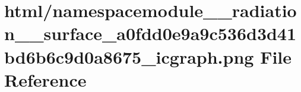 \hypertarget{namespacemodule____radiation____surface__a0fdd0e9a9c536d3d41bd6b6c9d0a8675__icgraph_8png}{}\section{html/namespacemodule\+\_\+\+\_\+radiation\+\_\+\+\_\+surface\+\_\+a0fdd0e9a9c536d3d41bd6b6c9d0a8675\+\_\+icgraph.png File Reference}
\label{namespacemodule____radiation____surface__a0fdd0e9a9c536d3d41bd6b6c9d0a8675__icgraph_8png}

